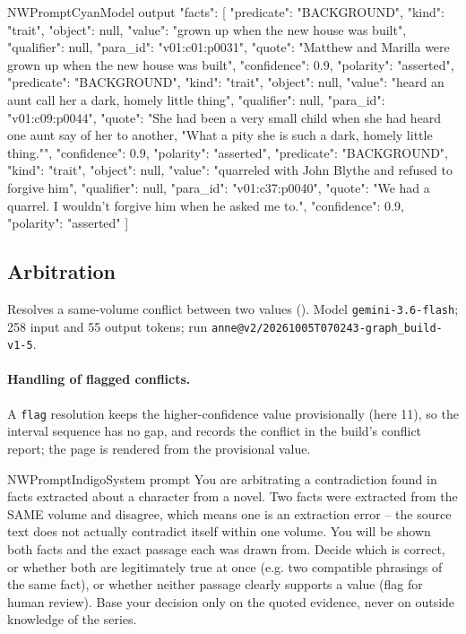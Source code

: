 \begin{nwprompt}{NWPromptCyan}{Model output}
{"facts": [
  {"predicate": "BACKGROUND", "kind": "trait", "object": null, "value": "grown up when the new house was built", "qualifier": null, "para_id": "v01:c01:p0031", "quote": "Matthew and Marilla were grown up when the new house was built", "confidence": 0.9, "polarity": "asserted"},
  {"predicate": "BACKGROUND", "kind": "trait", "object": null, "value": "heard an aunt call her a dark, homely little thing", "qualifier": null, "para_id": "v01:c09:p0044", "quote": "She had been a very small child when she had heard one aunt say of her to another, "What a pity she is such a dark, homely little thing."", "confidence": 0.9, "polarity": "asserted"},
  {"predicate": "BACKGROUND", "kind": "trait", "object": null, "value": "quarreled with John Blythe and refused to forgive him", "qualifier": null, "para_id": "v01:c37:p0040", "quote": "We had a quarrel. I wouldn't forgive him when he asked me to.", "confidence": 0.9, "polarity": "asserted"}
]}
\end{nwprompt}

\subsection*{Arbitration}
Resolves a same-volume conflict between two values (\sys). Model \texttt{gemini-3.6-flash}; 258 input and 55 output tokens; run \nolinkurl{anne@v2/20261005T070243-graph_build-v1-5}.

\paragraph{Handling of flagged conflicts.} A \texttt{flag} resolution keeps the
higher-confidence value provisionally (here 11), so the interval sequence has no gap, and
records the conflict in the build's conflict report; the page is rendered from the
provisional value.

\begin{nwprompt}{NWPromptIndigo}{System prompt}
You are arbitrating a contradiction found in facts extracted about a character from a novel. Two facts were extracted from the SAME volume and disagree, which means one is an extraction error -- the source text does not actually contradict itself within one volume. You will be shown both facts and the exact passage each was drawn from. Decide which is correct, or whether both are legitimately true at once (e.g. two compatible phrasings of the same fact), or whether neither passage clearly supports a value (flag for human review). Base your decision only on the quoted evidence, never on outside knowledge of the series.
\end{nwprompt}

